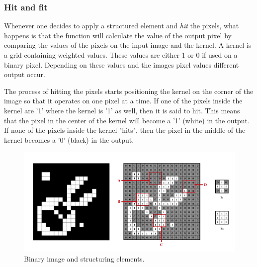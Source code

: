 \subsubsection{Hit and fit}
Whenever one decides to apply a structured element and \textit{hit} the pixels, what happens is that the function will calculate the value of the output pixel by comparing the values of the pixels on the input image and the kernel. A kernel is a grid containing weighted values. These values are either 1 or 0 if used on a binary pixel. Depending on these values and the images pixel values different output occur.

The process of hitting the pixels starts positioning the kernel on the corner of the image so that it operates on one pixel at a time. If one of the pixels inside the kernel are '1' where the kernel is '1' as well, then it is said to hit. This means that the pixel in the center of the kernel will become a '1' (white) in the output. If none of the pixels inside the kernel "hits", then the pixel in the middle of the kernel becomes a '0' (black) in the output.

\begin{figure}[htbp]
\centering
\includegraphics[width=1\textwidth]{Pictures/Theory/FitHitKernels.png}
\caption{Binary image and structuring elements.}
\label{fig:FitHit}
\end{figure}

